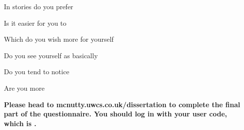 \documentclass[english,pdf,pagemark,stamp,globalid=\candidateID,oneside,PrintQuestionnaireId=False]{sdaps}
\begin{document}
\begin{questionnaire}
\begin{multicols}{2}
\begin{choicequestion}[2]{In stories do you prefer}
\end{choicequestion}

\begin{choicequestion}[2]{Is it easier for you to}
\end{choicequestion}

\begin{choicequestion}[2]{Which do you wish more for yourself}
\end{choicequestion}

\begin{choicequestion}[2]{Do you see yourself as basically}
\end{choicequestion}

\begin{choicequestion}[2]{Do you tend to notice}
\end{choicequestion}

\begin{choicequestion}[2]{Are you more}
\end{choicequestion}

\end{multicols}

\vspace{1cm}
\begin{center}
	\textbf{Please head to mcnutty.uwcs.co.uk/dissertation to complete the final part of the questionnaire. You should log in with your user code, which is \candidateID.}
\end{center}

  \end{questionnaire}
\end{document}
